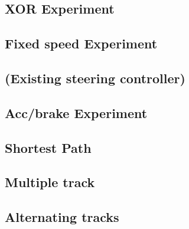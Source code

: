 \subsection{XOR Experiment}
\subsection{Fixed speed Experiment}
\subsection{(Existing steering controller)}
\subsection{Acc/brake Experiment}
\subsection{Shortest Path}
\subsection{Multiple track}
\subsection{Alternating tracks}


\iffalse

=== DISPOSITION ===

Desired behaviour (move racing theory to theory?)

Simulation
- Evaluation of results

Limitation of techniques to Neat (move to introduction?)

(Fixed network, exhaustive search)

Fundamentals of Neat

Usage/variations of Neat
- Starting structure or not
- Recurrent connections
- Population size
- Probabilities

Aspects in our tests
- Features in physics
- Different indata
  - (Grid)
  - Curve data
    - Angles?
    - Checkpoints
    - Sum
    - Mirror
- Different steering
- Different tracks and their properties
- Training process and task
  - Fitness calculation
  - Long single track
  - Several short parts
  - (Short alternating parts. Hopes for modular network. variants... what types of alternating tasks is needed?

Experiments
- Single long track
  - Fixed low speed, only steering
  - Steering and braking
  - Steer, accelerate and braking
- ...

\fi
 